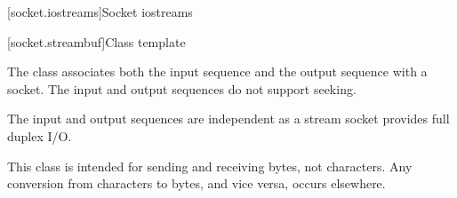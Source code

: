 
[socket.iostreams]{Socket iostreams}


[socket.streambuf]{Class template }

\pnum
The class  associates both the input sequence and the output sequence with a socket. The input and output sequences do not support seeking. \begin{note} The input and output sequences are independent as a stream socket provides full duplex I/O. \end{note}

\pnum
 \begin{note} This class is intended for sending and receiving bytes, not characters. Any conversion from characters to bytes, and vice versa, occurs elsewhere. \end{note}


